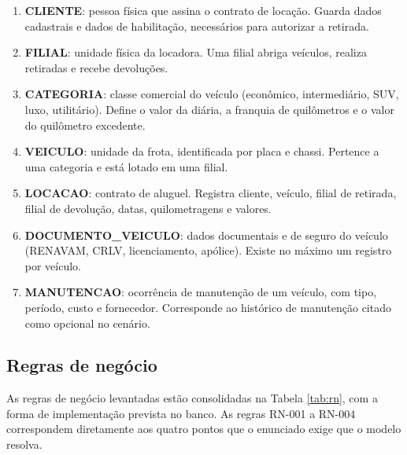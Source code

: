 \begin{enumerate}
\item \textbf{CLIENTE}: pessoa f\'isica que assina o contrato de loca\c{c}\~ao. Guarda dados cadastrais e dados de habilita\c{c}\~ao, necess\'arios para autorizar a retirada.
\item \textbf{FILIAL}: unidade f\'isica da locadora. Uma filial abriga ve\'iculos, realiza retiradas e recebe devolu\c{c}\~oes.
\item \textbf{CATEGORIA}: classe comercial do ve\'iculo (econ\^omico, intermedi\'ario, SUV, luxo, utilit\'ario). Define o valor da di\'aria, a franquia de quil\^ometros e o valor do quil\^ometro excedente.
\item \textbf{VEICULO}: unidade da frota, identificada por placa e chassi. Pertence a uma categoria e est\'a lotado em uma filial.
\item \textbf{LOCACAO}: contrato de aluguel. Registra cliente, ve\'iculo, filial de retirada, filial de devolu\c{c}\~ao, datas, quilometragens e valores.
\item \textbf{DOCUMENTO\_VEICULO}: dados documentais e de seguro do ve\'iculo (RENAVAM, CRLV, licenciamento, ap\'olice). Existe no m\'aximo um registro por ve\'iculo.
\item \textbf{MANUTENCAO}: ocorr\^encia de manuten\c{c}\~ao de um ve\'iculo, com tipo, per\'iodo, custo e fornecedor. Corresponde ao hist\'orico de manuten\c{c}\~ao citado como opcional no cen\'ario.
\end{enumerate}

\subsection{Regras de neg\'ocio}

As regras de neg\'ocio levantadas est\~ao consolidadas na Tabela \ref{tab:rn}, com a forma de implementa\c{c}\~ao prevista no banco. As regras RN-001 a RN-004 correspondem diretamente aos quatro pontos que o enunciado exige que o modelo resolva.

